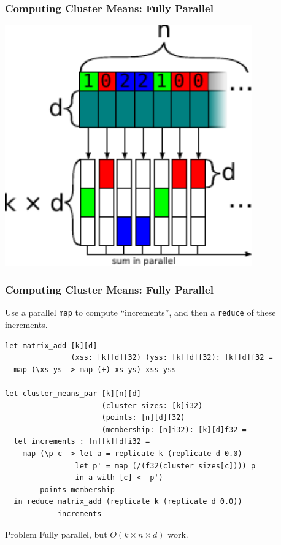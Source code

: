 \documentclass[rgb,dvipsnames]{beamer}
\begin{document}
\begin{frame}[fragile]
  \frametitle{Computing Cluster Means: Fully Parallel}

  \begin{center}
\includegraphics[width=0.8\textwidth]{img/cluster_means_par_1.pdf}
\end{center}
\end{frame}

\begin{frame}[fragile]
  \frametitle{Computing Cluster Means: Fully Parallel}

  Use a parallel \texttt{map} to compute ``increments'', and then a
  \texttt{reduce} of these increments.

\begin{lstlisting}
let matrix_add [k][d]
               (xss: [k][d]f32) (yss: [k][d]f32): [k][d]f32 =
  map (\xs ys -> map (+) xs ys) xss yss

let cluster_means_par [k][n][d]
                      (cluster_sizes: [k]i32)
                      (points: [n][d]f32)
                      (membership: [n]i32): [k][d]f32 =
  let increments : [n][k][d]i32 =
    map (\p c -> let a = replicate k (replicate d 0.0)
                let p' = map (/(f32(cluster_sizes[c]))) p
                in a with [c] <- p')
        points membership
  in reduce matrix_add (replicate k (replicate d 0.0))
            increments

\end{lstlisting}
\pause
  \begin{block}{Problem}
    Fully parallel, but $O(k\times{}n\times{}d)$ work.
  \end{block}
\end{frame}
\end{document}

